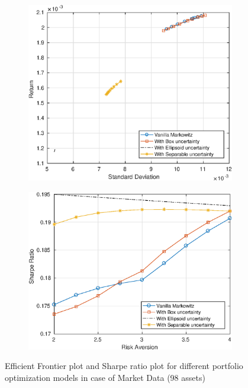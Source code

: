 \documentclass[12pt]{article}
\numberwithin{equation}{section}
\begin{document}
\begin{figure}[h]
\centering
\begin{subfigure}{.5\textwidth}
  \centering
  \includegraphics[width=.8\linewidth]{100_ef_ideal_range.eps}
\end{subfigure}%
\begin{subfigure}{.5\textwidth}
  \centering
  \includegraphics[width=.8\linewidth]{100_sr_ideal_range.eps}
\end{subfigure}
\caption{Efficient Frontier plot and Sharpe ratio plot for different portfolio optimization models in case of Market Data (98 assets)}
\label{fig:6}
\end{figure}

\newpage
\end{document}

